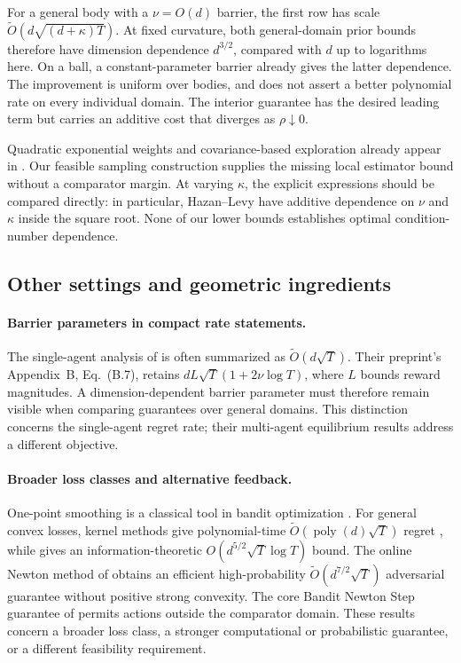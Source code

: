 \documentclass[11pt]{article}
\numberwithin{equation}{section}
\theoremstyle{definition}
\theoremstyle{remark}
\begin{document}
For a general body with a $\nu=O(d)$ barrier, the first row has scale
$\widetilde O(d\sqrt{(d+\kappa)T})$. At fixed curvature, both general-domain
prior bounds therefore have dimension dependence $d^{3/2}$, compared with
$d$ up to logarithms here. On a ball, a constant-parameter barrier already
gives the latter dependence. The improvement is uniform over bodies, and does
not assert a better polynomial rate on every individual domain. The interior
guarantee has the desired leading term but carries an additive cost that
diverges as $\rho\downarrow0$.

Quadratic exponential weights and covariance-based exploration already appear
in \citet{Ito20}. Our feasible sampling construction supplies the missing
local estimator bound without a comparator margin. At varying $\kappa$, the
explicit expressions should be compared directly: in particular, Hazan--Levy
have additive dependence on $\nu$ and $\kappa$ inside the square root. None of
our lower bounds establishes optimal condition-number dependence.

\subsection{Other settings and geometric ingredients}
\paragraph{Barrier parameters in compact rate statements.}
The single-agent analysis of \citet{Ba25} is often summarized as
$\widetilde O(d\sqrt T)$. Their preprint's Appendix~B, Eq.~(B.7), retains
$dL\sqrt T(1+2\nu\log T)$, where $L$ bounds reward magnitudes. A
dimension-dependent barrier parameter must therefore remain visible when
comparing guarantees over general domains. This distinction concerns the
single-agent regret rate; their multi-agent equilibrium results address a
different objective.

\paragraph{Broader loss classes and alternative feedback.}
One-point smoothing is a classical tool in bandit optimization \citep{FKM05}.
For general convex losses, kernel methods give polynomial-time
$\widetilde O(\operatorname{poly}(d)\sqrt T)$ regret \citep{BEL21}, while
\citet{Lat20} gives an information-theoretic
$O(d^{5/2}\sqrt T\log T)$ bound. The online Newton method of
\citet{Fokkema24} obtains an efficient high-probability
$\widetilde O(d^{7/2}\sqrt T)$ adversarial guarantee without positive strong
convexity. The core Bandit Newton Step guarantee of \citet{Suggala24}
permits actions outside the comparator domain. These results concern a broader
loss class, a stronger computational or probabilistic guarantee, or a different
feasibility requirement.
\end{document}
